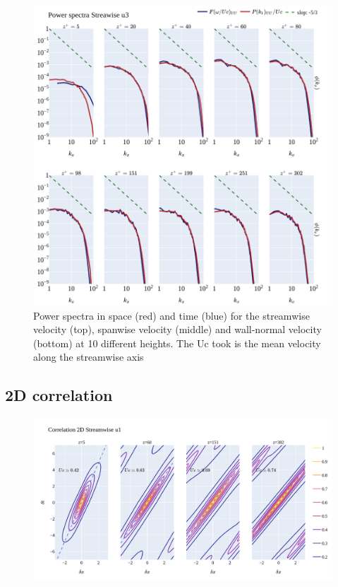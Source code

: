 \documentclass[]{article}
\theoremstyle{plain}
\theoremstyle{remark}
\begin{document}
\begin{figure}[h!]
	\begin{center}
		\includegraphics[width=\textwidth]{../output/split_time/frozen_turbulence/power_spectra/u3_all.png}
		\caption{Power spectra in space (red) and time (blue) for the streamwise velocity (top), spanwise velocity (middle) and wall-normal velocity (bottom) at 10 different heights. The Uc took is the mean velocity along the streamwise axis}
	\end{center}
\end{figure}

\subsection{2D correlation}

\begin{figure}[h!]
	\begin{center}
		\includegraphics[width=\textwidth]{../output/split_time/frozen_turbulence/correlation2D/u1.png}
		
	\end{center}
\end{figure}
\end{document}
